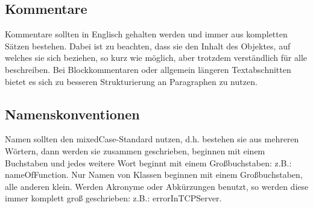 \subsection{Kommentare}
Kommentare sollten in Englisch gehalten werden und immer aus kompletten Sätzen bestehen. Dabei ist zu beachten, dass sie den Inhalt des Objektes, auf welches sie sich beziehen, so kurz wie möglich, aber trotzdem verständlich für alle beschreiben. Bei Blockkommentaren oder allgemein längeren Textabschnitten bietet es sich zu besseren Strukturierung an Paragraphen zu nutzen.

\subsection{Namenskonventionen}
Namen sollten den \grqq mixedCase\grqq -Standard nutzen, d.h. bestehen sie aus mehreren Wörtern, dann werden sie zusammen geschrieben, beginnen mit einem Buchstaben und jedes weitere Wort beginnt mit einem Großbuchstaben: z.B.: nameOfFunction. Nur Namen von Klassen beginnen mit einem Großbuchstaben, alle anderen klein. Werden Akronyme oder Abkürzungen benutzt, so werden diese immer komplett groß geschrieben: z.B.: errorInTCPServer.
